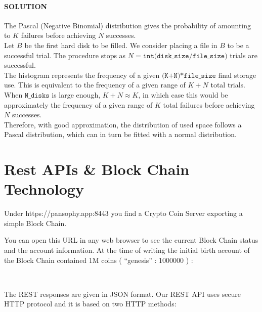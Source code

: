 \documentclass[11pt]{article}
\begin{document}
    \hypertarget{solution}{%
\paragraph{SOLUTION}\label{solution}}

The Pascal (Negative Binomial) distribution gives the probability of
amounting to \(K\) failures before achieving \(N\) successes.\\
Let \(B\) be the first hard disk to be filled. We consider placing a
file in \(B\) to be a successful trial. The procedure stops as
\(N = \texttt{int(disk}\_\texttt{size/file}\_\texttt{size)}\) trials are
successful.\\
The histogram represents the frequency of a given
\(\texttt{(K+N)*file}\_\texttt{size}\) final storage use. This is
equivalent to the frequency of a given range of \(K+N\) total trials.\\
When \(\texttt{N}\_\texttt{disks}\) is large enough, \(K+N \approx K\),
in which case this would be approximately the frequency of a given range
of \(K\) total failures before achieving \(N\) successes.\\
Therefore, with good approximation, the distribution of used space
follows a Pascal distribution, which can in turn be fitted with a normal
distribution.

    \hypertarget{rest-apis-block-chain-technology}{%
\section{Rest APIs \& Block Chain
Technology}\label{rest-apis-block-chain-technology}}

    Under https://pansophy.app:8443 you find a Crypto Coin Server exporting
a simple Block Chain.

You can open this URL in any web browser to see the current Block Chain
status and the account information. At the time of writing the initial
birth account of the Block Chain contained 1M coins ( ``genesis'' :
1000000 ) :

    \begin{center}
	\end{center}
	{ \hspace*{\fill} \\}


The REST responses are given in JSON format. Our REST API uses secure
HTTP protocol and it is based on two HTTP methods:
\end{document}
